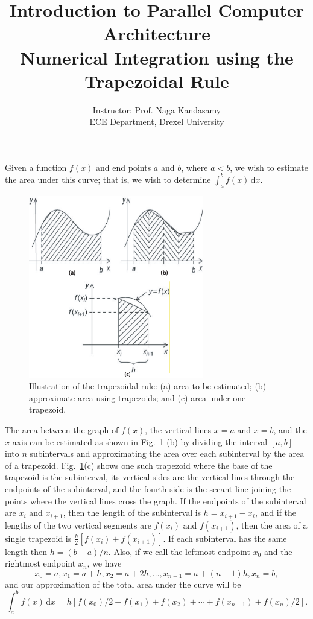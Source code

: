 \documentclass[12pt]{article}
\begin{document}
\title{Introduction to Parallel Computer Architecture \\
Numerical Integration using the Trapezoidal Rule}
\author{Instructor: Prof. Naga Kandasamy \\ ECE Department, Drexel University}
\maketitle %
\date{}

Given a function $f(x)$ and end points $a$ and $b$, where $a < b$, we wish to estimate the area under this curve; that is, we wish to determine $\int_{a}^{b} f(x)\, \mathrm{d}x$.

\begin{figure}[!h]
\centering
\includegraphics[width=3in]{trap}
\caption{Illustration of the trapezoidal rule: (a) area to be estimated; (b) approximate area using trapezoids; and (c) area under one trapezoid.} \vspace{-6pt}
\label{fig:trap}
\end{figure}

The area between the graph of $f(x)$, the vertical lines $x = a$ and $x = b$, and the $x$-axis can be estimated as shown in Fig.~\ref{fig:trap} (b) by dividing the interval $[a, b]$ into $n$ subintervals and approximating the area over each subinterval by the area of a trapezoid. Fig.~\ref{fig:trap}(c) shows one such trapezoid where the base of the trapezoid is the subinterval, its vertical sides are the vertical lines through the endpoints of the subinterval, and the fourth side is the secant line joining the points where the vertical lines cross the graph. If the endpoints of the subinterval are $x_i$ and $x_{i+1}$, then the length of the subinterval is $h = x_{i + 1} - x_i$, and if the lengths of the two vertical segments are $f(x_i)$ and $f(x_{i + 1})$, then the area of a single trapezoid is $\frac{h}{2}[f(x_i) + f(x_{i+1})]$. If each subinterval has the same length then $h = (b - a)/n$. Also, if we call the leftmost endpoint $x_0$ and the rightmost endpoint $x_n$, we have
\begin{equation*}
x_0 = a, x_1 = a + h, x_2 = a + 2h, \ldots, x_{n-1} = a + (n-1)h, x_n = b,
\end{equation*}
and our approximation of the total area under the curve will be
\begin{equation*}
\int_{a}^{b} f(x)\, \mathrm{d}x = h[f(x_0)/2 + f(x_1) + f(x_2) + \cdots + f(x_{n-1}) + f(x_n)/2].
\end{equation*}
\end{document}
